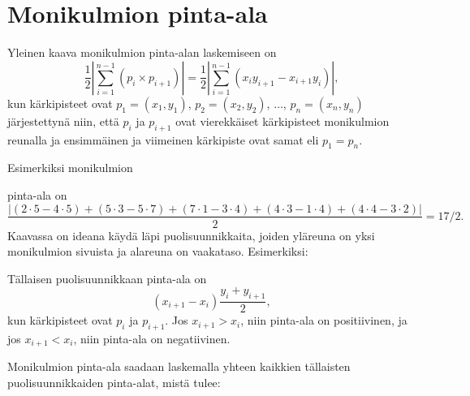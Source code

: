 \section{Monikulmion pinta-ala}

Yleinen kaava monikulmion pinta-alan laskemiseen on
\[\frac{1}{2} |\sum_{i=1}^{n-1} (p_i \times p_{i+1})| =
\frac{1}{2} |\sum_{i=1}^{n-1} (x_i y_{i+1} - x_{i+1} y_i)|, \]
kun kärkipisteet ovat
$p_1=(x_1,y_1)$, $p_2=(x_2,y_2)$, $\ldots$, $p_n=(x_n,y_n)$
järjestettynä niin,
että $p_i$ ja $p_{i+1}$ ovat vierekkäiset kärkipisteet
monikulmion reunalla
ja ensimmäinen ja viimeinen kärkipiste ovat samat eli $p_1=p_n$.

Esimerkiksi monikulmion
\begin{center}
\end{center}
pinta-ala on
\[\frac{|(2\cdot5-4\cdot5)+(5\cdot3-5\cdot7)+(7\cdot1-3\cdot4)+(4\cdot3-1\cdot4)+(4\cdot4-3\cdot2)|}{2} = 17/2.\]
Kaavassa on ideana käydä läpi puolisuunnikkaita,
joiden yläreuna on yksi monikulmion sivuista ja
alareuna on vaakataso. Esimerkiksi:
\begin{center}
\end{center}
Tällaisen puolisuunnikkaan pinta-ala on
\[(x_{i+1}-x_{i}) \frac{y_i+y_{i+1}}{2},\]
kun kärkipisteet ovat $p_i$ ja $p_{i+1}$.
Jos $x_{i+1}>x_{i}$, niin pinta-ala on positiivinen,
ja jos $x_{i+1}<x_{i}$, niin pinta-ala on negatiivinen.

Monikulmion pinta-ala saadaan laskemalla yhteen kaikkien
tällaisten puolisuunnikkaiden pinta-alat, mistä tulee:

